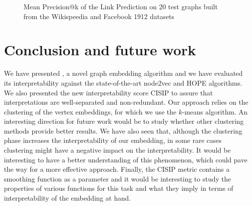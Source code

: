 \begin{figure}
   \centering
    \caption[Precision@k results of the Link Prediction experiment]{Mean Precision@k of the Link Prediction on 20 test graphs built from the Wikispeedia and Facebook 1912 datasets}
    \label{fig:lp_results}
\end{figure}

\section{Conclusion and future work}\label{sec:conclusion}
We have presented \parfaite{}, a novel graph embedding algorithm and we have evaluated its interpretability against the state-of-the-art node2vec and HOPE algorithms. We also presented the new interpretability score CISIP to assure that interpretations are well-separated and non-redundant.
Our approach relies on the clustering of the vertex embeddings, for which we use the $k$-means algorithm. An interesting direction for future work would be to study whether other clustering methods provide better results. We have also seen that, although the clustering phase increases the interpretability of our embedding, in some rare cases clustering might have a negative impact on the interpretability. It would be interesting to have a better understanding of this phenomenon, which could pave the way for a more effective approach.  Finally, the CISIP metric contains a smoothing function as a parameter and it would be interesting to study the properties of various functions for this task and what they imply in terms of interpretability of the embedding at hand.

